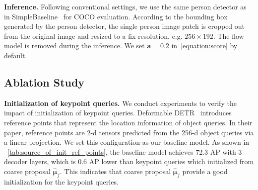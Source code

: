 \documentclass[runningheads]{llncs}
\def\Loc{{\boldsymbol{\mu}}}
\def\a{\mathbf{a}}
\def\KPF{{\hat{\mathbf{\Loc}}_f}}
\begin{document}
\noindent\textbf{Inference. }
Following conventional settings, we use the same person detector as in SimpleBaseline~\cite{xiao2018simple} for COCO evaluation.
According to the bounding box generated by the person detector, the single person image patch is cropped out from the original image and resized to a fix resolution, e.g.  $256\times192$. The flow model is removed during the inference. We set $\a=0.2$ in~\cref{equation:score} by default.













        

























        




\subsection{Ablation Study}



























\noindent\textbf{Initialization of keypoint queries.} 
We conduct experiments to verify the impact of initialization of keypoint queries. Deformable DETR~\cite{zhu2020deformable} introduces reference points that represent the location information of object queries. In their paper, reference points are 2-d tensors predicted from the 256-d object queries via a linear projection. We set this configuration as our baseline model. As shown in ~\cref{tab:source_of_init_ref_points}, the baseline model achieves 72.3 AP with 3 decoder layers, which is $0.6$ AP lower than keypoint queries which initialized from coarse proposal $\KPF$.
This indicates that coarse proposal $\KPF$ provide a good initialization for the keypoint queries.
\end{document}
